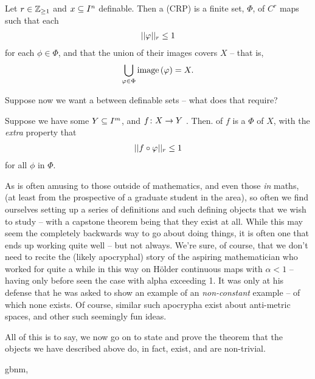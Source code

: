 \begin{definition}
  Let $r \in \Zgeq{1}$ and $\CIn[x]{n}$ definable. Then a \emph{\cellrparam} (CRP) is a finite set, $\Phi$, of  $C^r$ \cellr maps such that each
    \begin{align*}
      \rnorm[r]{\phi} \leq 1
    \end{align*}
  for each $\phi \in \Phi$, and that the union of their images covers $X$ -- that is,
    \begin{align*}
      \bigcup_{\phi \in \Phi} \image{\phi} = X.
    \end{align*}
\end{definition}
Suppose now we want a \cellrparam between definable sets -- what does that require?
\begin{definition}
  Suppose we have some $\CIn[Y]{m}$, and $\funcdom{f}{X}{Y}$ . Then. \cellrparam[r] of $f$ is a \cellrparam[r] $\Phi$ of $X$, with the \emph{extra} property that
    \begin{align*}
      \rnorm[r]{f \circ \phi} \leq 1
    \end{align*}
    for all $\phi$ in $\Phi$.
\end{definition}

As is often amusing to those outside of mathematics, and even those \emph{in} maths, (at least from the prospective of a graduate student in the area), so often we find ourselves setting up a series of definitions and such defining objects that we wish to study -- with a capstone theorem being that they exist at all. While this may seem the completely backwards way to go about doing things, it is often one that ends up working quite well -- but not always. We're sure, of course, that we don't need to recite the (likely apocryphal) story of the aspiring mathematician who worked for quite a while in this way on H\"older continuous maps with $\alpha < 1$ -- having only before seen the case with alpha exceeding 1. It was only at his defense that he was asked to show an example of an \emph{non-constant} example -- of which none exists. Of course, similar such apocrypha exist about anti-metric spaces, and other such seemingly fun ideas.

All of this is to say, we now go on to state and prove the theorem that the objects we have described above do, in fact, exist, and are non-trivial.

\begin{theorem}
gbnm,
  \label{thm:existence}
\end{theorem}

